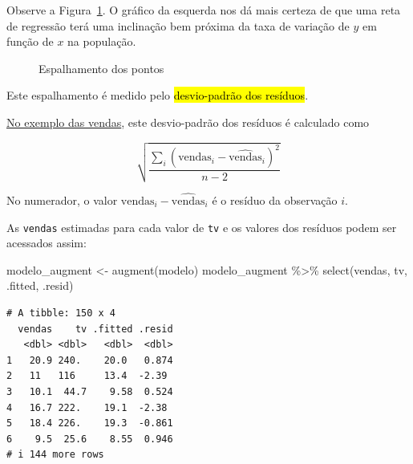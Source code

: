 \documentclass[
  letterpaper,
  DIV=11,
  numbers=noendperiod]{scrreprt}
\newenvironment{Shaded}{\begin{snugshade}}{\end{snugshade}}
\newcommand{\FunctionTok}[1]{\textcolor[rgb]{0.28,0.35,0.67}{#1}}
\newcommand{\NormalTok}[1]{\textcolor[rgb]{0.00,0.23,0.31}{#1}}
\newcommand{\OtherTok}[1]{\textcolor[rgb]{0.00,0.23,0.31}{#1}}
\newcommand{\SpecialCharTok}[1]{\textcolor[rgb]{0.37,0.37,0.37}{#1}}
\begin{document}
Observe a Figura~\ref{fig-spread}. O gráfico da esquerda nos dá mais
certeza de que uma reta de regressão terá uma inclinação bem próxima da
taxa de variação de $y$ em função de $x$ na população.

\begin{figure}[htb]


\caption{\label{fig-spread}Espalhamento dos pontos}

\end{figure}%

Este espalhamento é medido pelo {\hl{desvio-padrão dos resíduos}}.

\hyperref[lm-vendas-tv]{No exemplo das vendas}, este desvio-padrão dos
resíduos é calculado como

\[
\displaystyle
\sqrt{
\frac{\sum_i (\text{vendas}_i - \widehat{\text{vendas}}_i)^2}{n-2}
}
\]

No numerador, o valor $\text{vendas}_i - \widehat{\text{vendas}}_i$ é o
resíduo da observação $i$.

As \texttt{vendas} estimadas para cada valor de \texttt{tv} e os valores
dos resíduos podem ser acessados assim:

\begin{Shaded}
\begin{Highlighting}[]
\NormalTok{modelo\_augment }\OtherTok{\textless{}{-}} \FunctionTok{augment}\NormalTok{(modelo)}
\NormalTok{modelo\_augment }\SpecialCharTok{\%\textgreater{}\%} 
  \FunctionTok{select}\NormalTok{(vendas, tv, .fitted, .resid)}
\end{Highlighting}
\end{Shaded}

\begin{verbatim}
# A tibble: 150 x 4
  vendas    tv .fitted .resid
   <dbl> <dbl>   <dbl>  <dbl>
1   20.9 240.    20.0   0.874
2   11   116     13.4  -2.39 
3   10.1  44.7    9.58  0.524
4   16.7 222.    19.1  -2.38 
5   18.4 226.    19.3  -0.861
6    9.5  25.6    8.55  0.946
# i 144 more rows
\end{verbatim}
\end{document}
